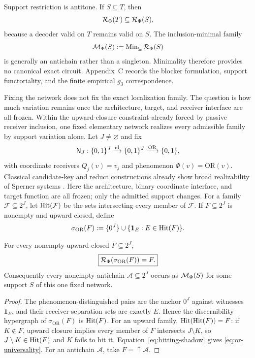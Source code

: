 Support restriction is antitone. If $S\subseteq T$, then
\begin{equation}
\mathcal{R}_\Phi(T)\subseteq\mathcal{R}_\Phi(S),
\label{eq:support-restriction-main}
\end{equation}
because a decoder valid on $T$ remains valid on $S$. The inclusion-minimal family
\[
\mathcal{M}_\Phi(S):=\operatorname{Min}_{\subseteq}\mathcal{R}_\Phi(S)
\]
is generally an antichain rather than a singleton. Minimality therefore provides no canonical exact circuit. Appendix~C records the blocker formulation, support functoriality, and the finite empirical $g_3$ correspondence.

Fixing the network does not fix the exact localization family. The question is how much variation remains once the architecture, target, and receiver interface are all frozen. Within the upward-closure constraint already forced by passive receiver inclusion, one fixed elementary network realizes every admissible family by support variation alone. Let $J\neq\varnothing$ and fix
\begin{equation}
\mathsf{N}_J:
\{0,1\}^J
\xrightarrow{\operatorname{id}}
\{0,1\}^J
\xrightarrow{\mathrm{OR}}
\{0,1\},
\label{eq:fixed-or}
\end{equation}
with coordinate receivers $Q_j(v)=v_j$ and phenomenon $\Phi(v)=\mathrm{OR}(v)$. Classical candidate-key and reduct constructions already show broad realizability of Sperner systems \citep{demetrovics1979keys,demetrovics2014reducts}. Here the architecture, binary coordinate interface, and target function are all frozen; only the admitted support changes. For a family $\mathcal F\subseteq2^J$, let $\operatorname{Hit}(\mathcal F)$ be the sets intersecting every member of $\mathcal F$. If $F\subseteq2^J$ is nonempty and upward closed, define
\begin{equation}
\sigma_{\mathrm{OR}}(F)
:=
\{0^J\}\cup\{\mathbf1_E:E\in\operatorname{Hit}(F)\}.
\label{eq:or-support}
\end{equation}

\begin{theorem}
\label{thm:fixed-or-support-universality}
For every nonempty upward-closed $F\subseteq2^J$,
\begin{equation}
\boxed{
\mathcal{R}_\Phi(\sigma_{\mathrm{OR}}(F))=F.
}
\label{eq:or-universality}
\end{equation}
Consequently every nonempty antichain $\mathcal A\subseteq2^J$ occurs as $\mathcal{M}_\Phi(S)$ for some support $S$ of this one fixed network.
\end{theorem}
\begin{proof}
The phenomenon-distinguished pairs are the anchor $0^J$ against witnesses $\mathbf1_E$, and their receiver-separation sets are exactly $E$. Hence the discernibility hypergraph of $\sigma_{\mathrm{OR}}(F)$ is $\operatorname{Hit}(F)$. For an upward family, $\operatorname{Hit}(\operatorname{Hit}(F))=F$: if $K\notin F$, upward closure implies every member of $F$ intersects $J\setminus K$, so $J\setminus K\in\operatorname{Hit}(F)$ and $K$ fails to hit it. Equation~\eqref{eq:hitting-shadow} gives \eqref{eq:or-universality}. For an antichain $\mathcal A$, take $F=\uparrow\mathcal A$.
\end{proof}

